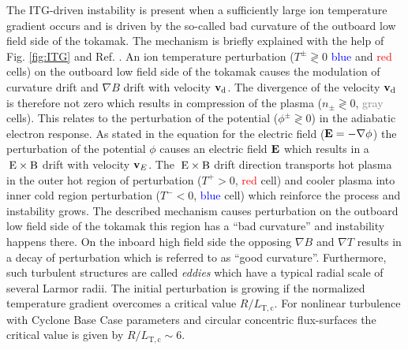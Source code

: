 The ITG-driven instability is present when a sufficiently large ion temperature gradient occurs and is driven by the so-called bad curvature of the outboard low field side of the tokamak. The mechanism is briefly explained with the help of Fig. \ref{fig:ITG} and Ref. . An ion temperature perturbation ($T^\pm \gtrless 0$ \textcolor{blue}{blue} and \textcolor{red}{red} cells) on the outboard low field side of the tokamak causes the modulation of curvature drift and $\nabla B$ drift with velocity $\boldsymbol{\mathbf{v}}_\mathrm{d}$. The divergence of the velocity $\boldsymbol{\mathbf{v}}_\mathrm{d}$ is therefore not zero which results in compression of the plasma ($n_\pm \gtrless 0$, \textcolor{gray}{gray} cells). This relates to the perturbation of the potential ($\phi^\pm  \gtrless 0$) in the adiabatic electron response. As stated in the equation for the electric field ($\boldsymbol{\mathbf{E}} = -\nabla \phi$) the perturbation of the potential $\phi$ causes an electric field $\boldsymbol{\mathbf{E}}$ which results in a $\mathrm{\:E}\times\mathrm{B}$ drift with velocity $\boldsymbol{\mathbf{v}}_E$. The $\mathrm{\:E}\times\mathrm{B}$ drift direction transports hot plasma in the outer hot region of perturbation ($T^+ > 0$, \textcolor{red}{red} cell) and cooler plasma into inner cold region perturbation ($T^- < 0$, \textcolor{blue}{blue} cell) which reinforce the process and instability grows.
\newpage
The described mechanism causes perturbation on the outboard low field side of the tokamak this region has a \enquote{bad curvature} and instability happens there. On the inboard high field side the opposing $\nabla B$ and $\nabla T$ results in a decay of perturbation which is referred to as \enquote{good curvature}. Furthermore, such turbulent structures are called \textit{eddies} which have a typical radial scale of several Larmor radii. \cite{Newins2006}
The initial perturbation is growing if the normalized temperature gradient overcomes a critical value $R/L_\mathrm{T,c}$. For nonlinear turbulence with Cyclone Base Case parameters and circular concentric flux-surfaces the critical value is given by $R/L_\mathrm{T,c} \sim 6$. \cite{Dimits2000, Isliker2010}